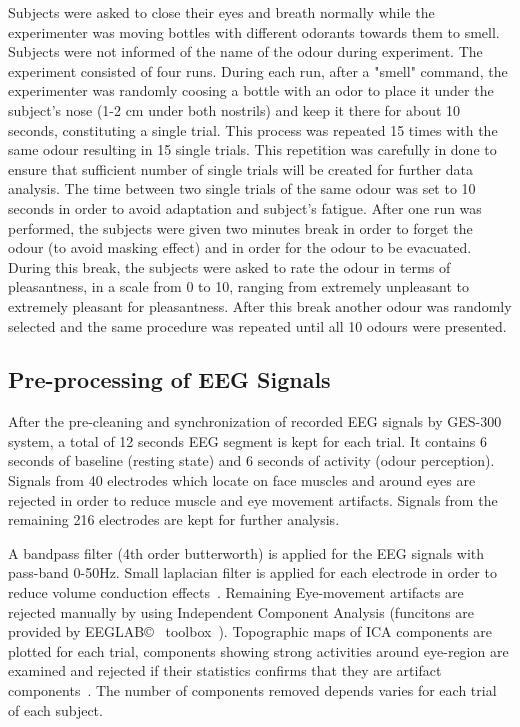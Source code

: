 Subjects were asked to close their eyes and breath normally while the experimenter was moving bottles with different odorants towards them to smell. Subjects were not informed of the name of the odour during experiment. The experiment consisted of four runs. During each run, after a "smell" command, the experimenter was randomly coosing a bottle with an odor to place it under the subject's nose (1-2 cm under both nostrils) and keep it there for about 10 seconds, constituting a single trial. This process was repeated 15 times with the same odour resulting in 15 single trials. This repetition was carefully in done to ensure that sufficient number of single trials will be created for further data analysis. The time between two single trials of the same odour was set to 10 seconds in order to avoid adaptation and subject's fatigue. After one run was performed, the subjects were given two minutes break in order to forget the odour (to avoid masking effect) and in order for the odour to be evacuated. During this break, the subjects were asked to rate the odour in terms of pleasantness, in a scale from 0 to 10, ranging from extremely unpleasant to extremely pleasant for pleasantness. After this break another odour was randomly selected and the same procedure was repeated until all 10 odours were presented.    

\subsection{Pre-processing of EEG Signals}
After the pre-cleaning and synchronization of recorded EEG signals by GES-300 system, a total of 12 seconds EEG segment is kept for each trial. It contains 6 seconds of baseline (resting state) and 6 seconds of activity (odour perception). Signals from 40 electrodes which locate on face muscles and around eyes are rejected in order to reduce muscle and eye movement artifacts. Signals from the remaining 216 electrodes are kept for further analysis. 

A bandpass filter (4th order butterworth) is applied for the EEG signals with pass-band 0-50Hz. Small laplacian filter is applied for each electrode in order to reduce volume conduction effects~\cite{wolters2007volume}. Remaining Eye-movement artifacts are rejected manually by using Independent Component Analysis (funcitons are provided by EEGLAB\copyright~ toolbox~\cite{luck2014introduction}). Topographic maps of ICA components are plotted for each trial, components showing strong activities around eye-region are examined and rejected if their statistics confirms that they are artifact components~\cite{luck2014introduction}. The number of components removed depends varies for each trial of each subject. 

